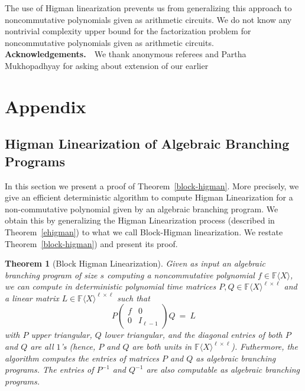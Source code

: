 \documentclass[10pt,a4paper]{article}
\newtheorem{theorem}{Theorem}[section]
\newcommand{\F}{\mathbb{F}}
\renewcommand{\angle}[1]{\langle #1 \rangle}
\newcommand{\FX}{\F\angle{X}}
\newcommand{\fR}{\FX}
\begin{document}
The use of Higman linearization prevents us from generalizing this
approach to noncommutative polynomials given as arithmetic
circuits. We do not know any nontrivial complexity upper bound for the
factorization problem for noncommutative polynomials given as
arithmetic circuits.\\

\noindent\textbf{Acknowledgements.}~~We thank anonymous referees
and Partha Mukhopadhyay for asking about extension of our earlier

\appendix

\section{Appendix}

%

\subsection{Higman Linearization of Algebraic Branching Programs}

In this section we present a proof of Theorem~\ref{block-higman}. More
precisely, we give an efficient deterministic algorithm to compute
Higman Linearization for a non-commutative polynomial given by an
algebraic branching program. We obtain this by generalizing the Higman
Linearization process (described in Theorem~\ref{ehigman}) to what we call
Block-Higman linearization. We restate Theorem~\ref{block-higman}) and
present its proof.

%
%
%
%

\begin{theorem}[Block Higman Linearization]\label{blockhigthm}
  Given as input an algebraic branching program of size $s$ computing
  a noncommutative polynomial $f\in\fR$, we can compute in
  deterministic polynomial time matrices
  $P, Q\in\fR^{\ell \times \ell}$ and a linear matrix
  $L\in\fR^{\ell\times \ell}$ such that
\begin{equation}\label{higeq-block-polynomial}
%
P\left(
\begin{array}{c|c}
f & 0 \\
\hline
0 & I_{\ell-1}
\end{array}
\right)Q ~=~L
\end{equation}
with $P$ upper triangular, $Q$ lower triangular, and the diagonal
entries of both $P$ and $Q$ are all $1$'s (hence, $P$ and $Q$ are both
units in $\fR^{\ell \times \ell}$). Futhermore, the algorithm computes
the entries of matrices $P$ and $Q$ as algebraic branching programs.
The entries of $P^{-1}$ and $Q^{-1}$ are also computable as algebraic
branching programs.

%
%
\end{theorem}
\end{document}
